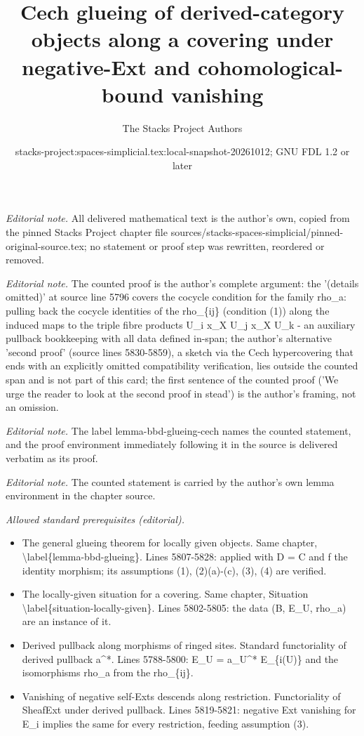 \documentclass{stacks-project}
\title{Cech glueing of derived-category objects along a covering under negative-Ext and cohomological-bound vanishing}
\author{The Stacks Project Authors}
\date{stacks-project:spaces-simplicial.tex:local-snapshot-20261012; GNU FDL 1.2 or later}
\theoremstyle{plain}
\theoremstyle{definition}
\theoremstyle{remark}
\numberwithin{equation}{subsection}
\begin{document}
\maketitle
\noindent\textit{Editorial note.} All delivered mathematical text is the author's own, copied from the pinned Stacks Project chapter file sources/stacks-spaces-simplicial/pinned-original-source.tex; no statement or proof step was rewritten, reordered or removed.\par\medskip
\noindent\textit{Editorial note.} The counted proof is the author's complete argument: the '(details omitted)' at source line 5796 covers the cocycle condition for the family rho\_a: pulling back the cocycle identities of the rho\_\{ij\} (condition (1)) along the induced maps to the triple fibre products U\_i x\_X U\_j x\_X U\_k - an auxiliary pullback bookkeeping with all data defined in-span; the author's alternative 'second proof' (source lines 5830-5859), a sketch via the Cech hypercovering that ends with an explicitly omitted compatibility verification, lies outside the counted span and is not part of this card; the first sentence of the counted proof ('We urge the reader to look at the second proof in stead') is the author's framing, not an omission.\par\medskip
\noindent\textit{Editorial note.} The label lemma-bbd-glueing-cech names the counted statement, and the proof environment immediately following it in the source is delivered verbatim as its proof.\par\medskip
\noindent\textit{Editorial note.} The counted statement is carried by the author's own lemma environment in the chapter source.\par\medskip
\noindent\textit{Allowed standard prerequisites (editorial).}\begin{itemize}
\item The general glueing theorem for locally given objects. Same chapter, \textbackslash{}label\{lemma-bbd-glueing\}. Lines 5807-5828: applied with D = C and f the identity morphism; its assumptions (1), (2)(a)-(c), (3), (4) are verified.
\item The locally-given situation for a covering. Same chapter, Situation \textbackslash{}label\{situation-locally-given\}. Lines 5802-5805: the data (B, E\_U, rho\_a) are an instance of it.
\item Derived pullback along morphisms of ringed sites. Standard functoriality of derived pullback a\textasciicircum{}*. Lines 5788-5800: E\_U = a\_U\textasciicircum{}* E\_\{i(U)\} and the isomorphisms rho\_a from the rho\_\{ij\}.
\item Vanishing of negative self-Exts descends along restriction. Functoriality of SheafExt under derived pullback. Lines 5819-5821: negative Ext vanishing for E\_i implies the same for every restriction, feeding assumption (3).
\end{itemize}\medskip
\end{document}
